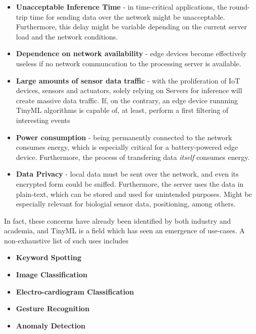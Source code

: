 \begin{itemize}
  \item \textbf{Unacceptable Inference Time} - in time-critical applications, the round-trip time for sending data over the network might be unacceptable. Furthermore, this delay might be variable depending on the current server load and the network conditions.
  \item \textbf{Dependence on network availability} - edge devices become effectively useless if no network communcation to the processing server is available.
  \item \textbf{Large amounts of sensor data traffic} - with the proliferation of IoT devices, sensors and actuators, solely relying on Servers for inference will create massive data traffic. If, on the contrary, an edge device runnning TinyML algorithms is capable of, at least, perform a first filtering of interesting events
  \item \textbf{Power consumption} - being permanently connected to the network consumes energy, which is especially critical for a battery-powered edge device. Furthermore, the process of transfering data \textit{itself} consumes energy.
  \item \textbf{Data Privacy} - local data must be sent over the network, and even its encrypted form could be sniffed. Furthermore, the server uses the data in plain-text, which can be stored and used for unintended purposes. Might be especially relevant for biologial sensor data, positioning, among others.
\end{itemize}

In fact, these concerns have already been identified by both industry and academia, and TinyML is a field which has seen an emergence of use-cases. A non-exhaustive list of such uses includes

\begin{itemize}
  \item \textbf{Keyword Spotting}
  \item \textbf{Image Classification}
  \item \textbf{Electro-cardiogram Classification}
  \item \textbf{Gesture Recognition}
  \item \textbf{Anomaly Detection}
\end{itemize}

